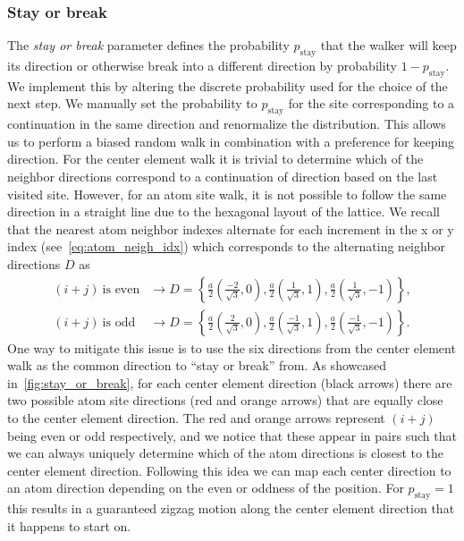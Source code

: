 \subsubsection{Stay or break}
The \textit{stay or break} parameter defines the probability
$p_{\text{stay}}$ that the walker will keep its direction or otherwise break
into a different direction by probability $1-p_{\text{stay}}$. We implement this by altering the discrete probability used for the choice of the next step. We manually set the probability to $p_{\text{stay}}$ for the site corresponding to a continuation in the same direction and renormalize the distribution. This allows us to perform a biased random walk in combination with a preference for keeping direction. For the center element
walk it is trivial to determine which of the neighbor directions correspond to
a continuation of direction based on the last visited site. However, for an atom site walk, it is not possible to follow the same direction in a straight line due to the hexagonal layout of the lattice. We recall that the
nearest atom neighbor indexes alternate for each increment in the x or y index (see~\cref{eq:atom_neigh_idx}) which corresponds to the alternating neighbor directions $D$ as
\begin{align*}
  (i + j) \ \text{is even} &\rightarrow D = \left\{ \frac{a}{2}\left(\frac{-2}{\sqrt{3}}, 0\right), \frac{a}{2}\left(\frac{1}{\sqrt{3}}, 1\right), \frac{a}{2}\left(\frac{1}{\sqrt{3}}, -1\right)\right\}, \\
  (i + j) \ \text{is odd} &\rightarrow D = \left\{ \frac{a}{2}\left(\frac{2}{\sqrt{3}}, 0\right), \frac{a}{2}\left(\frac{-1}{\sqrt{3}}, 1\right), \frac{a}{2}\left(\frac{-1}{\sqrt{3}}, -1\right)\right\}.
\end{align*}
One way to mitigate this issue is to use the six directions from the center element walk as the common direction to ``stay or break'' from. As showcased in~\cref{fig:stay_or_break}, for each center element direction (black arrows) there are two possible atom site directions (red and orange arrows) that are equally close to the center element direction. The red and orange arrows represent $(i+j)$ being even or odd respectively, and we notice that these appear in pairs such that we can always uniquely determine which of the atom directions is closest to the center element direction. Following this idea we can map each center direction to an atom direction depending on the even or oddness of the position. For $p_{\text{stay}} = 1$ this results in a guaranteed zigzag motion along the center element direction that it happens to start on. 

